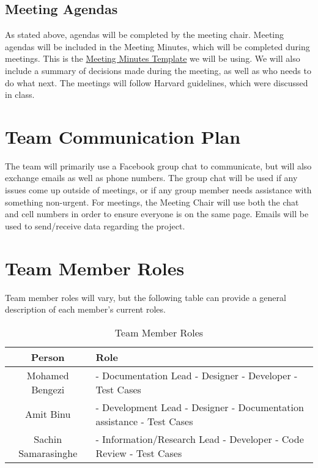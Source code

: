 \documentclass[12pt]{article}
\begin{document}
\subsection{Meeting Agendas}
As stated above, agendas will be completed by the meeting chair. Meeting agendas will be included in the Meeting Minutes, which will be completed during meetings. This is the \href{run:./docs/MeetingMinutesTemplates.pdf}{Meeting Minutes Template} we will be using. We will also include a summary of decisions made during the meeting, as well as who needs to do what next. The meetings will follow Harvard guidelines, which were discussed in class.

\section{Team Communication Plan}
The team will primarily use a Facebook group chat to communicate, but will also exchange emails as well as phone numbers.
The group chat will be used if any issues come up outside of meetings, or if any group member needs assistance with something non-urgent. For meetings, the Meeting Chair will use both the chat and cell numbers in order to ensure everyone is on the same page. Emails will be used to send/receive data regarding the project.

\newpage

\section{Team Member Roles}
Team member roles will vary, but the following table can provide a general description of each member's current roles. 
\begin{table}[h]
\begin{center}
\begin{tabular}{ | c | p{65mm} |  }
\hline
 Person & Role  \\ 
\hline
Mohamed Bengezi & - Documentation Lead \newline - Designer \newline - Developer \newline - Test Cases  \\  
\hline
 Amit Binu & - Development Lead \newline - Designer \newline - Documentation assistance \newline - Test Cases  \\
\hline
 Sachin Samarasinghe & - Information/Research Lead \newline - Developer \newline - Code Review \newline - Test Cases
\\
\hline 
\end{tabular}
\end{center}
\caption{Team Member Roles}
\end{table}
\end{document}
